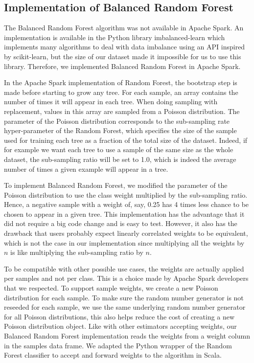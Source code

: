 \documentclass[conference]{IEEEtran}
\begin{document}
\subsection{Implementation of Balanced Random Forest}

The Balanced Random Forest algorithm was not available in Apache Spark.
An implementation is available in the Python library
imbalanced-learn\cite{imbalance} which implements many algorithms to deal
with data imbalance using an API inspired by scikit-learn\cite{imbalance}, but the size of
our dataset made it impossible for us to use this library. Therefore, we
implemented Balanced Random Forest in Apache Spark.

In the Apache Spark implementation of Random Forest, the bootstrap step is
made before starting to grow any tree. For each sample, an array contains
the number of times it will appear in each tree. When doing sampling with
replacement, values in this array are sampled from a Poisson distribution.
The parameter of the Poisson distribution corresponds to the sub-sampling
rate hyper-parameter of the Random Forest, which specifies the size of the
sample used for training each tree as a fraction of the total size of the
dataset. Indeed, if for example we want each tree to use a sample of the
same size as the whole dataset, the sub-sampling ratio will be set to 1.0,
which is indeed the average number of times a given example will appear in a tree.

To implement Balanced Random Forest, we modified the parameter of
the Poisson distribution to use the class weight multiplied by the
sub-sampling ratio. Hence, a negative sample with a weight
of, say, 0.25 has 4 times less chance to be chosen to appear in a given tree. This
implementation has the advantage that it did not require a big code change
and is easy to test. However, it also has the drawback that users probably
expect linearly correlated weights to be equivalent, which is not the case
in our implementation since multiplying all the weights by $n$ is like multiplying
the sub-sampling ratio by $n$.

To be compatible with other possible use cases, the weights are
actually applied per samples and not per class. This is a choice made by
Apache Spark developers that we respected. To support sample
weights, we create a new Poisson distribution for each sample. To make sure
the random number generator is not reseeded for each sample, we use the
same underlying random number generator for all Poisson distributions, this
also helps reduce the cost of creating a new Poisson distribution object.
Like with other estimators accepting weights, our Balanced Random Forest
implementation reads the weights from a weight column in the samples data frame.
We adapted the Python wrapper of the Random Forest classifier to accept and
forward weights to the algorithm in Scala.
\end{document}
